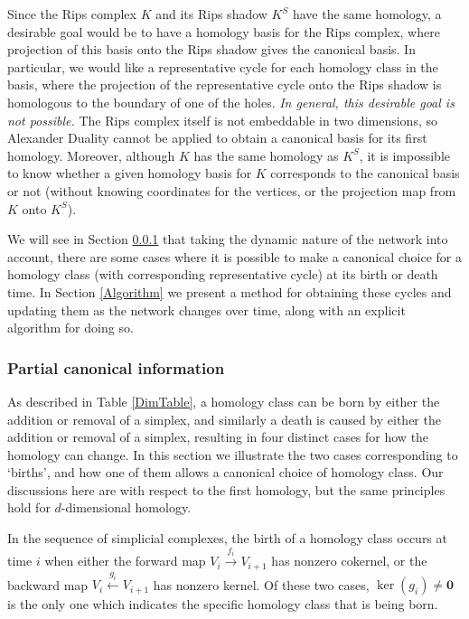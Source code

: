 \documentclass[12pt]{article}
\begin{document}
Since the Rips complex $K$ and its Rips shadow $K^S$ have the same homology, a desirable goal would be to have a homology basis for the Rips complex, where projection of this basis onto the Rips shadow gives the canonical basis. In particular, we would like a representative cycle for each homology class in the basis, where the projection of the representative cycle onto the Rips shadow is homologous to the boundary of one of the holes. \emph{In general, this desirable goal is not possible.} The Rips complex itself is not embeddable in two dimensions, so Alexander Duality cannot be applied to obtain a canonical basis for its first homology. Moreover, although $K$ has the same homology as $K^S$, it is impossible to know whether a given homology basis for $K$ corresponds to the canonical basis or not (without knowing coordinates for the vertices, or the projection map from $K$ onto $K^S$).

We will see in Section \ref{Partial} that taking the dynamic nature of the network into account, there are some cases where it is possible to make a canonical choice for a homology class (with corresponding representative cycle) at its birth or death time. In Section \ref{Algorithm} we present a method for obtaining these cycles and updating them as the network changes over time, along with an explicit algorithm for doing so.

\subsubsection{Partial canonical information}\label{Partial}

As described in Table \ref{DimTable}, a homology class can be born by either the addition or removal of a simplex, and similarly a death is caused by either the addition or removal of a simplex, resulting in four distinct cases for how the homology can change. In this section we illustrate the two cases corresponding to `births', and how one of them allows a canonical choice of homology class. Our discussions here are with respect to the first homology, but the same principles hold for $d$-dimensional homology.

In the sequence of simplicial complexes, the birth of a homology class occurs at time $i$ when either the forward map $V_i \overset{f_i}{\longrightarrow} V_{i+1}$ has nonzero cokernel, or the backward map $V_i \overset{g_i}{\longleftarrow} V_{i+1}$ has nonzero kernel. Of these two cases, $\ker(g_i) \neq \textbf{0}$ is the only one which indicates the specific homology class that is being born.
\end{document}
